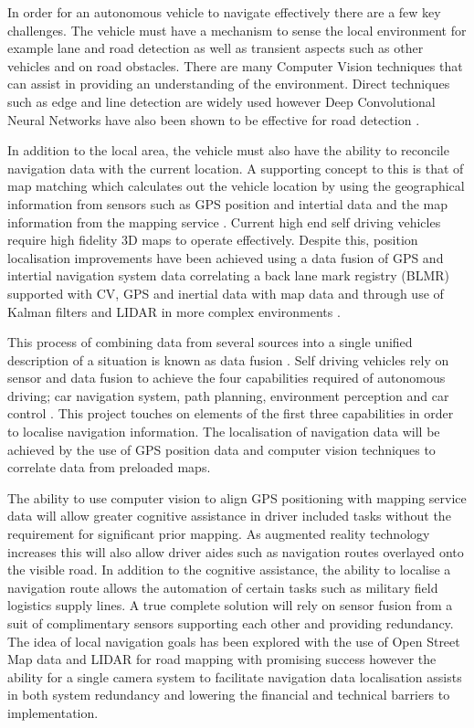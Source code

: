 \documentclass[]{aiaa-tc}%
\begin{document}
In order for an autonomous vehicle to navigate effectively there are a few key challenges. The vehicle must have a mechanism to sense the local environment for example lane and road detection as well as transient aspects such as other vehicles and on road obstacles. There are many Computer Vision techniques that can assist in providing an understanding of the environment. Direct techniques such as edge and line detection are widely used however Deep Convolutional Neural Networks have also been shown to be effective for road detection \citep{deepRoadSegmentation}.

In addition to the local area, the vehicle must also have the ability to reconcile navigation data with the current location. A supporting concept to this is that of map matching which calculates out the vehicle location by using the geographical information from sensors such as GPS position and intertial data and the map information from the mapping service \citep{keyTechSelfDriving}. Current high end self driving vehicles require high fidelity 3D maps to operate effectively. Despite this, position localisation improvements have been achieved using a data fusion of GPS and intertial navigation system data \citep{gpsInsFusion} correlating a back lane mark registry (BLMR) supported with CV, GPS and inertial data with map data \citep{lowCostSensorNav} and through use of Kalman filters and LIDAR in more complex environments \citep{robotLIDARSLAM}.

This process of combining data from several sources into a single unified description of a situation is known as data fusion \citep{gpsInsFusion}. Self driving vehicles rely on sensor and data fusion to achieve the four capabilities required of autonomous driving; car navigation system, path planning, environment perception and car control \citep{keyTechSelfDriving}. This project touches on elements of the first three capabilities in order to localise navigation information. The localisation of navigation data will be achieved by the use of GPS position data and computer vision techniques to correlate data from preloaded maps. 

The ability to use computer vision to align GPS positioning with mapping service data will allow greater cognitive assistance in driver included tasks without the requirement for significant prior mapping. As augmented reality technology increases this will also allow driver aides such as navigation routes overlayed onto the visible road. In addition to the cognitive assistance, the ability to localise a navigation route allows the automation of certain tasks such as military field logistics supply lines. A true complete solution will rely on sensor fusion from a suit of complimentary sensors supporting each other and providing redundancy. The idea of local navigation goals has been explored with the use of Open Street Map data and LIDAR for road mapping with promising success \citep{mitLocalNavDriving} however the ability for a single camera system to facilitate navigation data localisation assists in both system redundancy and lowering the financial and technical barriers to implementation.
\end{document}
